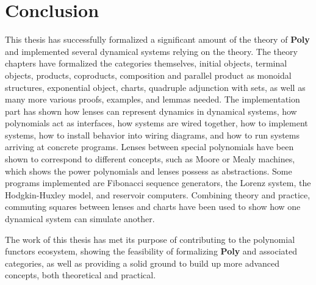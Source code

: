 \chapter{Conclusion}\label{chapter:conclusion}
This thesis has successfully formalized a significant amount of the theory of \textbf{Poly} and implemented several dynamical systems relying on the theory. 
The theory chapters have formalized the categories themselves, initial objects, terminal objects, products, coproducts, composition and parallel product as monoidal structures, exponential object, charts, quadruple adjunction with sets, as well as many more various proofs, examples, and lemmas needed. 
The implementation part has shown how lenses can represent dynamics in dynamical systems, how polynomials act as interfaces, how systems are wired together, how to implement systems, how to install behavior into wiring diagrams, and how to run systems arriving at concrete programs.
Lenses between special polynomials have been shown to correspond to different concepts, such as Moore or Mealy machines, which shows the power polynomials and lenses possess as abstractions.
Some programs implemented are Fibonacci sequence generators, the Lorenz system, the Hodgkin-Huxley model, and reservoir computers.
Combining theory and practice, commuting squares between lenses and charts have been used to show how one dynamical system can simulate another.

The work of this thesis has met its purpose of contributing to the polynomial functors ecosystem, showing the feasibility of formalizing \textbf{Poly} and associated categories, as well as providing a solid ground to build up more advanced concepts, both theoretical and practical. 
